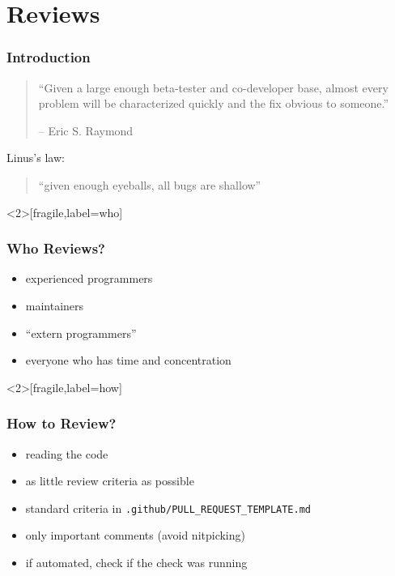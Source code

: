 \section{Reviews}

\begin{frame}
	\frametitle{Introduction}

	\begin{quote}
	``Given a large enough beta-tester and co-developer base, almost every problem will be characterized quickly and the fix obvious to someone.''

	-- Eric S. Raymond
	\end{quote}

	\pause
	\vspace{2cm}

	Linus's law:
	\begin{quote}
	``given enough eyeballs, all bugs are shallow''
	\end{quote}

	\vspace{1cm}
\end{frame}

\begin{frame}<2>[fragile,label=who]
	\frametitle{Who Reviews?}

	\pause

	\begin{itemize}[<+-| alert@+>]
	\item experienced programmers
	\item maintainers
	\item ``extern programmers''
	\item everyone who has time and concentration
	\end{itemize}
\end{frame}

\begin{frame}<2>[fragile,label=how]
	\frametitle{How to Review?}

	\pause

	\begin{itemize}[<+-| alert@+>]
	\item reading the code
	\item as little review criteria as possible
	\item standard criteria in \verb+.github/PULL_REQUEST_TEMPLATE.md+
	\item only important comments (avoid nitpicking)
	\item if automated, check if the check was running
	\end{itemize}
\end{frame}

